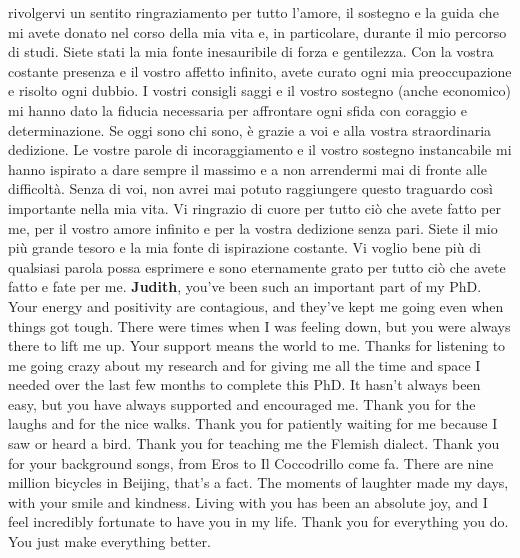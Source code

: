 \documentclass[10pt, twoside]{book} %
\begin{document}
rivolgervi un sentito ringraziamento per tutto l'amore, il sostegno e la guida che mi avete donato nel corso della mia vita e, in particolare, durante il mio percorso di studi. Siete stati la mia fonte inesauribile di forza e gentilezza. Con la vostra costante presenza e il vostro affetto infinito, avete curato ogni mia preoccupazione e risolto ogni dubbio. I vostri consigli saggi e il vostro sostegno (anche economico) mi hanno dato la fiducia necessaria per affrontare ogni sfida con coraggio e determinazione. Se oggi sono chi sono, è grazie a voi e alla vostra straordinaria dedizione. Le vostre parole di incoraggiamento e il vostro sostegno instancabile mi hanno ispirato a dare sempre il massimo e a non arrendermi mai di fronte alle difficoltà. Senza di voi, non avrei mai potuto raggiungere questo traguardo così importante nella mia vita. Vi ringrazio di cuore per tutto ciò che avete fatto per me, per il vostro amore infinito e per la vostra dedizione senza pari. Siete il mio più grande tesoro e la mia fonte di ispirazione costante. Vi voglio bene più di qualsiasi parola possa esprimere e sono eternamente grato per tutto ciò che avete fatto e fate per me. \textbf{Judith}, you've been such an important part of my PhD. Your energy and positivity are contagious, and they've kept me going even when things got tough. There were times when I was feeling down, but you were always there to lift me up. Your support means the world to me. Thanks for listening to me going crazy about my research and for giving me all the time and space I needed over the last few months to complete this PhD. It hasn't always been easy, but you have always supported and encouraged me. Thank you for the laughs and for the nice walks. Thank you for patiently waiting for me because I saw or heard a bird. Thank you for teaching me the Flemish dialect. Thank you for your background songs, from Eros to Il Coccodrillo come fa. There are nine million bicycles in Beijing, that's a fact. The moments of laughter made my days, with your smile and kindness. Living with you has been an absolute joy, and I feel incredibly fortunate to have you in my life. Thank you for everything you do. You just make everything better.
\clearpage


\end{document}
